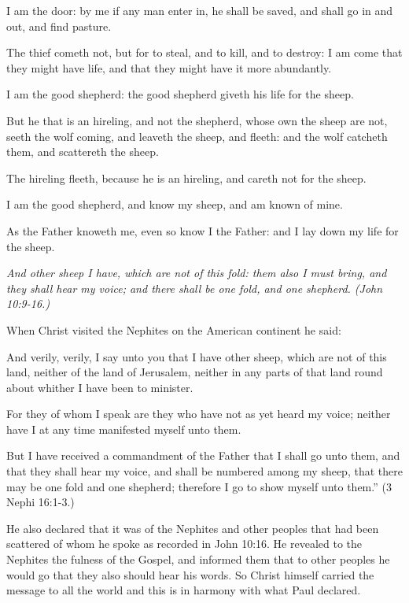 I am the door: by me if any man enter in, he shall be saved, and shall go in and out, and find
pasture.

The thief cometh not, but for to steal, and to kill, and to destroy: I am come that they might
have life, and that they might have it more abundantly.

I am the good shepherd: the good shepherd giveth his life for the sheep.

But he that is an hireling, and not the shepherd, whose own the sheep are not, seeth the wolf
coming, and leaveth the sheep, and fleeth: and the wolf catcheth them, and scattereth the
sheep.

The hireling fleeth, because he is an hireling, and careth not for the sheep.

I am the good shepherd, and know my sheep, and am known of mine.

As the Father knoweth me, even so know I the Father: and I lay down my life for the sheep.

\textit{And other sheep I have, which are not of this fold: them also I must bring, and they shall
hear my voice; and there shall be one fold, and one shepherd. (John 10:9-16.)}

When Christ visited the Nephites on the American continent he said:

And verily, verily, I say unto you that I have other sheep, which are not of this land, neither
of the land of Jerusalem, neither in any parts of that land round about whither I have been to
minister.

For they of whom I speak are they who have not as yet heard my voice; neither have I at any
time manifested myself unto them.

But I have received a commandment of the Father that I shall go unto them, and that they
shall hear my voice, and shall be numbered among my sheep, that there may be one fold and
one shepherd; therefore I go to show myself unto them.'' (3 Nephi 16:1-3.)

He also declared that it was of the Nephites and other peoples that had been scattered of
whom he spoke as recorded in John 10:16. He revealed to the Nephites the fulness of the
Gospel, and informed them that to other peoples he would go that they also should hear his
words. So Christ himself carried the message to all the world and this is in harmony with
what Paul declared.

